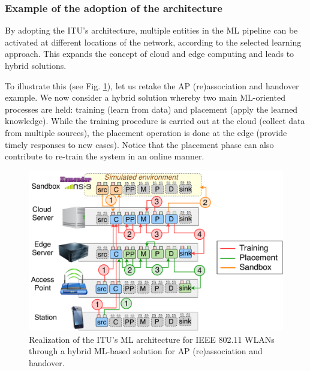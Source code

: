 \documentclass[journal]{IEEEtran}
\begin{document}

\subsubsection{Example of the adoption of the architecture}
By adopting the ITU's architecture, multiple entities in the ML pipeline can be activated at different locations of the network, according to the selected learning approach. This expands the concept of cloud and edge computing and leads to hybrid solutions.%

To illustrate this (see Fig. \ref{fig:ml_architecture_wlan}), let us retake the AP (re)association and handover example. We now consider a hybrid solution whereby two main ML-oriented processes are held: training (learn from data) and placement (apply the learned knowledge). While the training procedure is carried out at the cloud (collect data from multiple sources), the placement operation is done at the edge (provide timely responses to new cases). Notice that the placement phase can also contribute to re-train the system in an online manner. %

\begin{figure}[ht!]
	\includegraphics[width=1\columnwidth]{ml_architecture_wlan_2}
	\caption{Realization of the ITU's ML architecture for IEEE 802.11 WLANs through a hybrid ML-based solution for AP (re)association and handover.}
	\label{fig:ml_architecture_wlan}
\end{figure}
\end{document}
